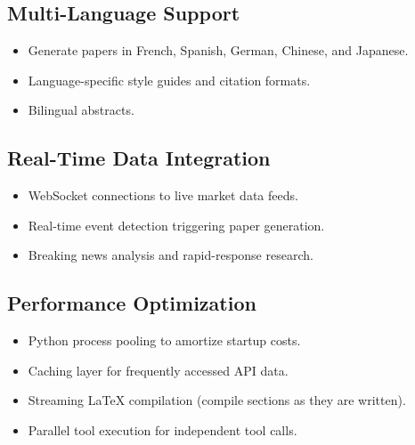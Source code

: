 \subsection{Multi-Language Support}

\begin{itemize}
  \item Generate papers in French, Spanish, German, Chinese, and Japanese.
  \item Language-specific style guides and citation formats.
  \item Bilingual abstracts.
\end{itemize}

\subsection{Real-Time Data Integration}

\begin{itemize}
  \item WebSocket connections to live market data feeds.
  \item Real-time event detection triggering paper generation.
  \item Breaking news analysis and rapid-response research.
\end{itemize}

\subsection{Performance Optimization}

\begin{itemize}
  \item Python process pooling to amortize startup costs.
  \item Caching layer for frequently accessed API data.
  \item Streaming \LaTeX{} compilation (compile sections as they are written).
  \item Parallel tool execution for independent tool calls.
\end{itemize}
